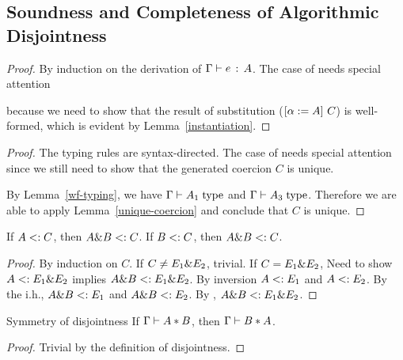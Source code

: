 \subsection{Soundness and Completeness of Algorithmic Disjointness}

\begin{proof}
By induction on the derivation of $\jtype \Gamma e A$. The case of  needs special attention
\begin{mathpar}
\end{mathpar}
because we need to show that the result of substitution ($\subst A \alpha C$) is well-formed, which is evident by Lemma~\ref{instantiation}.
\end{proof}

\begin{proof}
The typing rules are syntax-directed. The case of  needs special attention since we still need to show that the generated coercion $C$ is unique.
\begin{mathpar}
\end{mathpar}
By Lemma~\ref{wf-typing}, we have $\jwf \Gamma {A_1}$ and $\jwf \Gamma {A_3}$. Therefore we are able to apply Lemma~\ref{unique-coercion} and conclude that $C$ is unique.
\end{proof}

\begin{theorem}
  If $A \subtype C$, then $A \inter B \subtype C$.
  If $B \subtype C$, then $A \inter B \subtype C$.
\end{theorem}


\begin{proof}
  By induction on $C$.
  If $C \neq E_1 \inter E_2$, trivial.
  If $C = E_1 \inter E_2$,
  Need to show $A \subtype E_1 \inter E_2$ implies $A \inter B \subtype E_1 \inter E_2$.
  By inversion $A \subtype E_1$ and $A \subtype E_2$.
  By the i.h., $A \inter B \subtype E_1$ and $A \inter B \subtype E_2$.
  By , $A \inter B \subtype E_1 \inter E_2$.
\end{proof}

\begin{lemma}{Symmetry of disjointness} \label{lemma:symmetry-of-disjointness}
  If $\jdis \Gamma A B$, then $\jdis \Gamma B A$.
\end{lemma}

\begin{proof}
  Trivial by the definition of disjointness.
\end{proof}

